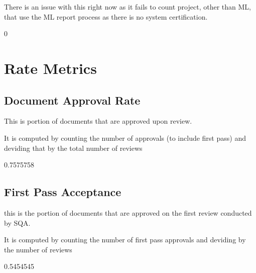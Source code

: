 \documentclass{article}
\begin{document}
There is an issue with this right now as it fails to count project, other than ML,
that use the ML report process as there is no system certification.

\begin{Schunk}
\begin{Soutput}
[1] 0
\end{Soutput}
\end{Schunk}

\section{Rate Metrics}
\subsection{Document Approval Rate}
This is portion of documents that are approved upon review.

It is computed by counting the number of approvals (to include first pass)
and deviding that by the total number of reviews

\begin{Schunk}
\begin{Soutput}
[1] 0.7575758
\end{Soutput}
\end{Schunk}

\subsection{First Pass Acceptance}
this is the portion of documents that are approved on the first review conducted
by SQA.

It is computed by counting the number of first pass approvals and deviding by
the number of reviews

\begin{Schunk}
\begin{Soutput}
[1] 0.5454545
\end{Soutput}
\end{Schunk}
\end{document}
